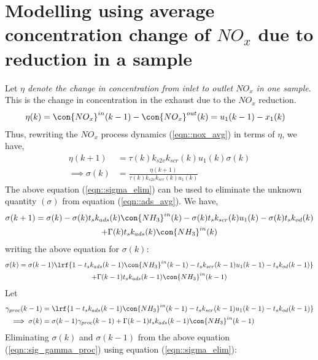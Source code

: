 \section{Modelling using average concentration change of $NO_x$ due to reduction in a sample}
Let \textit{$\eta$ denote the change in concentration from inlet to outlet $NO_x$ in one sample}. This is the change in
concentration in the exhaust due to the $NO_x$ reduction.
%
\begin{align}
        \eta(k) &= \con{NO_x}^{in}(k-1) - \con{NO_x}^{out}(k) = u_1(k-1) - x_1(k)
\end{align}
%
Thus, rewriting the $NO_x$ process dynamics (\ref{eqn::nox_avg}) in terms of $\eta$, we have,
\begin{align}
        \eta(k+1) &= \tau(k) k_{s2v} k_{scr}(k) u_1(k) \sigma(k)\\
        \implies \sigma(k) &= \frac{\eta(k+1)}{\tau(k) k_{s2v} k_{scr}(k) u_1(k)}
        \label{eqn::sigma_elim}
\end{align}
%
The above equation (\ref{eqn::sigma_elim}) can be used to eliminate the unknown quantity $(\sigma)$ from equation (\ref{eqn::ads_avg}). We have,
\begin{multline}
        \sigma(k+1) = \sigma(k) - \sigma(k) t_s k_{ads}(k) \con{NH_3}^{in}(k)
                        - \sigma(k) t_s k_{scr}(k) u_1(k)
                        - \sigma(k) t_s k_{od}(k)
                        \\ + \Gamma(k) t_s k_{ads}(k) \con{NH_3}^{in}(k)
\end{multline}
writing the above equation for $\sigma(k)$:
\begin{multline*}
         \sigma(k) = \sigma(k-1)\lrf{1 -  t_s k_{ads}(k-1) \con{NH_3}^{in}(k-1)
                        -  t_s k_{scr}(k-1) u_1(k-1)
                        -  t_s k_{od}(k-1)}
                        \\ + \Gamma(k-1) t_s k_{ads}(k-1) \con{NH_3}^{in}(k-1)
\end{multline*}
Let
\begin{align}
        \gamma_{proc}(k-1) &= \lrf{1 -  t_s k_{ads}(k-1) \con{NH_3}^{in}(k-1)
                        -  t_s k_{scr}(k-1) u_1(k-1)
                        -  t_s k_{od}(k-1)}
        \label{eqn::gamma_proc}
        \\
        \implies \sigma(k) &= \sigma(k-1) \gamma_{proc}(k-1) + \Gamma(k-1) t_s k_{ads}(k-1) \con{NH_3}^{in}(k-1)
        \label{eqn::sig_gamma_proc}
\end{align}
Eliminating $\sigma(k)$ and $\sigma(k-1)$ from the above equation (\ref{eqn::sig_gamma_proc}) using equation (\ref{eqn::sigma_elim}):
